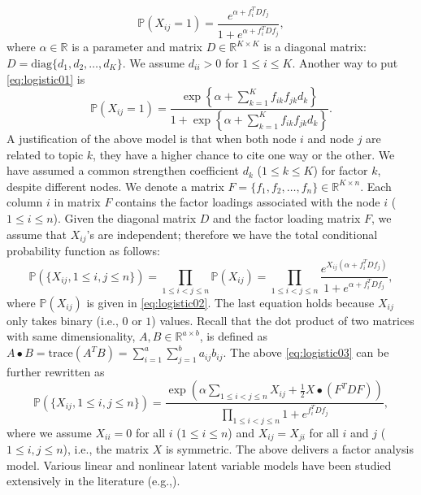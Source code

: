 \documentclass[AMS,STIX1COL]{WileyNJD-v2}
\begin{document}
\begin{equation}
\label{eq:logistic01}
\mathbb{P}(X_{ij}=1) = \frac{e^{\alpha + f_i^T D f_j }}{1 + e^{\alpha + f_i^T D f_j }},
\end{equation}
where $\alpha \in \mathbb{R}$ is a parameter and matrix $D \in \mathbb{R}^{K \times K}$ is a diagonal matrix: $D = \mbox{diag}\{d_{1},d_{2},\ldots,d_{K}\}$.
We assume $d_{ii} > 0$ for $1 \le i \le K$.
Another way to put \eqref{eq:logistic01} is
\begin{equation}
\label{eq:logistic02}
\mathbb{P}(X_{ij}=1) = \frac{\exp\left\{\alpha + \sum_{k=1}^K f_{ik}f_{jk}d_{k} \right\}}{1 + \exp\left\{\alpha + \sum_{k=1}^K f_{ik}f_{jk}d_{k} \right\}}.
\end{equation}
A justification of the above model is that when both node $i$ and node $j$ are related to topic $k$, they have a higher chance to cite one way or the other.
We have assumed a common strengthen coefficient $d_k$ ($1\le k \le K$) for factor $k$, despite different nodes.
We denote a matrix $F = \{f_1, f_2, \ldots, f_n\} \in \mathbb{R}^{K \times n}$.
Each column $i$ in matrix $F$ contains the factor loadings associated with the node $i$ ($1\le i \le n$).
Given the diagonal matrix $D$ and the factor loading matrix $F$, we assume that $X_{ij}$'s are independent; therefore we have the total conditional probability function as follows:
\begin{equation}
\label{eq:logistic03}
\mathbb{P}(\{X_{ij}, 1\le i,j \le n\})
= \prod_{1\le i<j \le n} \mathbb{P}(X_{ij})
= \prod_{1\le i<j \le n}  \frac{e^{X_{ij}(\alpha + f_i^T D f_j) }}{1 + e^{\alpha + f_i^T D f_j }},
\end{equation}
where $\mathbb{P}(X_{ij})$ is given in \eqref{eq:logistic02}.
The last equation holds because $X_{ij}$ only takes binary (i.e., $0$ or $1$) values.
Recall that the dot product of two matrices with same dimensionality, $A,B\in \mathbb{R}^{a \times b}$, is defined as $A\bullet B=\mbox{trace}(A^T B) = \sum_{i=1}^a\sum_{j=1}^b a_{ij}b_{ij}$.
The above \eqref{eq:logistic03} can be further rewritten as
\begin{equation}
\label{eq:logistic04}
\mathbb{P}(\{X_{ij}, 1\le i,j \le n\})
= \frac{\exp(\alpha \sum_{1\le i< j\le n}X_{ij} +\frac{1}{2} X \bullet (F^T D F))}{\prod_{1\le i<j \le n}  1 + e^{f_i^T D f_j }},
\end{equation}
where we assume $X_{ii}=0$ for all $i$ ($1\le i \le n$) and $X_{ij} = X_{ji}$ for all $i$ and $j$ ($1\le i,j \le n$), i.e., the matrix $X$ is symmetric.
The above delivers a factor analysis model.
Various linear and nonlinear latent variable models have been studied extensively in the literature (e.g.,\cite{joreskog1969general, mcdonald2014factor,lord2008statistical, rasch1980probabilistic, harman1960modern, joreskog1970general}).
\end{document}
